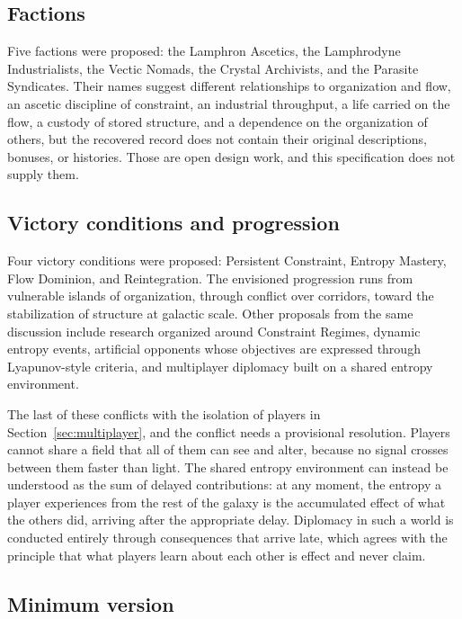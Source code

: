 \documentclass[11pt]{article}
\begin{document}
\subsection{Factions}

Five factions were proposed: the Lamphron Ascetics, the Lamphrodyne Industrialists, the Vectic Nomads, the Crystal Archivists, and the Parasite Syndicates. Their names suggest different relationships to organization and flow, an ascetic discipline of constraint, an industrial throughput, a life carried on the flow, a custody of stored structure, and a dependence on the organization of others, but the recovered record does not contain their original descriptions, bonuses, or histories. Those are open design work, and this specification does not supply them.

\subsection{Victory conditions and progression}

Four victory conditions were proposed: Persistent Constraint, Entropy Mastery, Flow Dominion, and Reintegration. The envisioned progression runs from vulnerable islands of organization, through conflict over corridors, toward the stabilization of structure at galactic scale. Other proposals from the same discussion include research organized around Constraint Regimes, dynamic entropy events, artificial opponents whose objectives are expressed through Lyapunov-style criteria, and multiplayer diplomacy built on a shared entropy environment.

The last of these conflicts with the isolation of players in Section~\ref{sec:multiplayer}, and the conflict needs a provisional resolution. Players cannot share a field that all of them can see and alter, because no signal crosses between them faster than light. The shared entropy environment can instead be understood as the sum of delayed contributions: at any moment, the entropy a player experiences from the rest of the galaxy is the accumulated effect of what the others did, arriving after the appropriate delay. Diplomacy in such a world is conducted entirely through consequences that arrive late, which agrees with the principle that what players learn about each other is effect and never claim.

\subsection{Minimum version}
\end{document}
